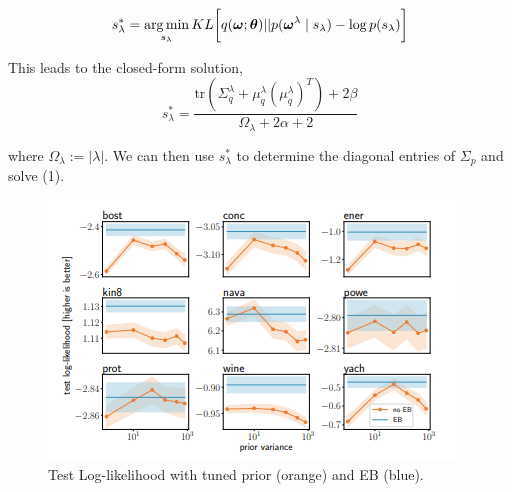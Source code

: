$$
s^*_\lambda = \mathop{\arg\min}\limits_{s_\lambda} KL\bigg[q(\bm{\omega};\bm{\theta})||p(\bm{\omega}^\lambda\mid s_\lambda) - \log p(s_\lambda)\bigg]
$$

This leads to the closed-form solution,
$$
s^*_\lambda = \frac{\text{tr}(\Sigma_q^\lambda+\mu_q^\lambda(\mu_q^\lambda)^T)+2\beta}{\Omega_\lambda + 2\alpha + 2}
$$

where $\Omega_\lambda := |\lambda|$. We can then use $s^*_\lambda$ to determine the diagonal entries of $\Sigma_p$ and solve (1).

\begin{figure}[H]
\centering
\includegraphics[scale=.5]{fig/empirical-bayes.png}
\caption{Test Log-likelihood with tuned prior (orange) and EB (blue).}
\label{fig:emp_bayes}
\end{figure}
